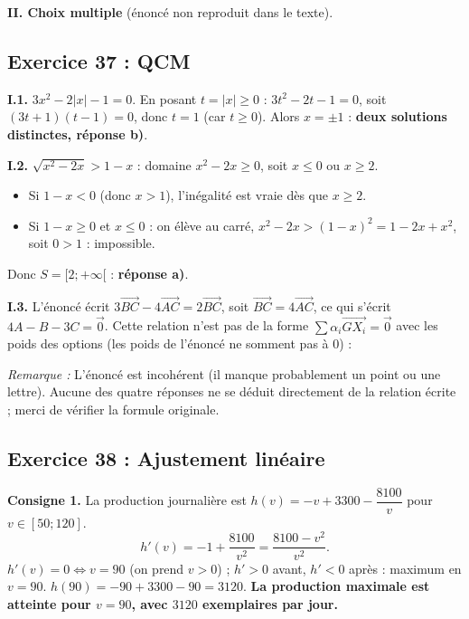 \documentclass[11pt,a4paper]{article}
\newcommand{\vect}[1]{\overrightarrow{#1}}
\newenvironment{rem}{\par\medskip\noindent\textit{Remarque :}\quad}{\par\medskip}
\begin{document}
\textbf{II. Choix multiple} (\'enonc\'e non reproduit dans le texte).

\subsection{Exercice 37 : QCM}

\textbf{I.1.} $3x^2-2|x|-1=0$. En posant $t=|x|\ge0$ : $3t^2-2t-1=0$, soit $(3t+1)(t-1)=0$, donc $t=1$ (car $t\ge0$).
Alors $x=\pm1$ : \textbf{deux solutions distinctes, r\'eponse b)}.

\textbf{I.2.} $\sqrt{x^2-2x}>1-x$ : domaine $x^2-2x\ge0$, soit $x\le0$ ou $x\ge2$.
\begin{itemize}
  \item Si $1-x<0$ (donc $x>1$), l'in\'egalit\'e est vraie d\`es que $x\ge2$.
  \item Si $1-x\ge0$ et $x\le0$ : on \'el\`eve au carr\'e, $x^2-2x>(1-x)^2=1-2x+x^2$, soit $0>1$ : impossible.
\end{itemize}
Donc $S=[2;+\infty[$ : \textbf{r\'eponse a)}.

\textbf{I.3.} L'\'enonc\'e \'ecrit $3\vect{BC}-4\vect{AC}=2\vect{BC}$, soit $\vect{BC}=4\vect{AC}$, ce qui s'\'ecrit $4A-B-3C=\vec 0$.
Cette relation n'est pas de la forme $\sum\alpha_i\vect{GX_i}=\vec 0$ avec les poids des options (les poids de l'\'enonc\'e ne somment pas \`a $0$) :
\begin{rem} L'\'enonc\'e est incoh\'erent (il manque probablement un point ou une lettre). Aucune des quatre r\'eponses ne se d\'eduit
directement de la relation \'ecrite ; merci de v\'erifier la formule originale.\end{rem}

\subsection{Exercice 38 : Ajustement lin\'eaire}

\textbf{Consigne 1.} La production journali\`ere est $h(v)=-v+3300-\dfrac{8100}{v}$ pour $v\in[50;120]$.
\[
h'(v)=-1+\frac{8100}{v^2}=\frac{8100-v^2}{v^2}.
\]
$h'(v)=0\iff v=90$ (on prend $v>0$) ; $h'>0$ avant, $h'<0$ apr\`es : maximum en $v=90$.
$h(90)=-90+3300-90=3120$. \textbf{La production maximale est atteinte pour $v=90$, avec $3120$ exemplaires par jour.}
\end{document}
